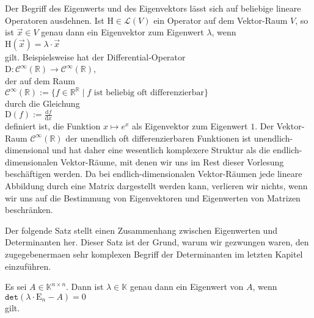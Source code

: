 \remark
Der Begriff des Eigenwerts und des Eigenvektors l\"asst sich auf beliebige lineare Operatoren
ausdehnen.  Ist $\mathrm{H} \in \mathcal{L}(V)$ ein Operator auf dem Vektor-Raum $V$, so ist
$\vec{x} \in V$ genau dann ein Eigenvektor zum Eigenwert $\lambda$, wenn 
\\[0.2cm]
\hspace*{1.3cm}
$\mathrm{H}(\vec{x}) = \lambda \cdot \vec{x}$
\\[0.2cm]
gilt.  Beispielsweise hat der Differential-Operator 
\\[0.2cm]
\hspace*{1.3cm}
$\mathrm{D}: \mathcal{C}^\infty(\mathbb{R}) \rightarrow  \mathcal{C}^\infty(\mathbb{R})$, 
\\[0.2cm]
der auf dem Raum 
\\[0.2cm]
\hspace*{1.3cm}
$\mathcal{C}^\infty(\mathbb{R}) := \bigl\{ f \in \mathbb{R}^\mathbb{R} \mid \mbox{$f$ ist beliebig oft  differenzierbar} \bigr\}$
\\[0.2cm]
durch die Gleichung
\\[0.2cm]
\hspace*{1.3cm}
$\mathrm{D}(f) := \displaystyle\frac{\mathrm{d}f}{\mathrm{d}x}$
\\[0.2cm]
definiert ist, die Funktion $x \mapsto e^x$ als Eigenvektor zum Eigenwert $1$.  
Der Vektor-Raum $\mathcal{C}^\infty(\mathbb{R})$ der unendlich oft differenzierbaren Funktionen ist
unendlich-dimensional und hat daher eine wesentlich komplexere Struktur als die
endlich-dimensionalen Vektor-R\"aume, mit denen wir uns im Rest dieser Vorlesung besch\"aftigen werden.
Da bei endlich-dimensionalen Vektor-R\"aumen jede lineare Abbildung durch eine Matrix dargestellt
werden kann, verlieren wir nichts, wenn wir uns auf die Bestimmung von Eigenvektoren und Eigenwerten
von Matrizen beschr\"anken. 
\eox

Der folgende Satz stellt einen Zusammenhang zwischen Eigenwerten und Determinanten her.  Dieser Satz
ist der Grund, warum wir gezwungen waren, den zugegebenerma\3en sehr komplexen Begriff der
Determinanten im letzten Kapitel einzuf\"uhren.

\begin{Satz}
  Es sei $A \in \mathbb{K}^{n \times n}$.  Dann ist $\lambda \in \mathbb{K}$ genau dann ein
  Eigenwert von $A$, wenn 
  \\[0.2cm]
  \hspace*{1.3cm}
  $\mathtt{det}(\lambda \cdot \mathrm{E}_n - A) = 0$
  \\[0.2cm]
  gilt. 
\end{Satz}
\pagebreak

